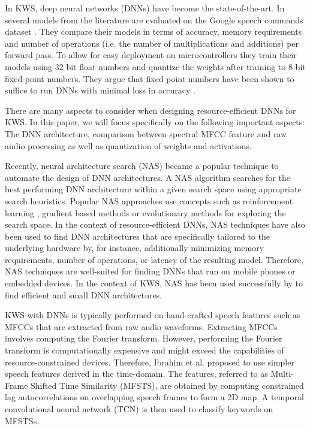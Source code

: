 \documentclass[a4paper]{article}
\begin{document}
In KWS, deep neural networks (DNNs) have become the state-of-the-art. In \cite{Zhang2017} several models from the literature \cite{Chen2014,Sainath2015,Arik2017,Sun2016} are evaluated on the Google speech commands dataset \cite{Warden2018}. They compare their models in terms of accuracy, memory requirements and number of operations (i.e. the number of multiplications and additions)  per forward pass. To allow for easy deployment on microcontrollers they train their models using 32 bit float numbers and quantize the weights after training to 8 bit fixed-point numbers. They argue that fixed point numbers have been shown to suffice to run DNNs with minimal loss in accuracy \cite{Suda2016,Qiu2016,Lai2017}.

There are many aspects to consider when designing resource-efficient DNNs for KWS. In this paper, we will focus specifically on the following important aspects: The DNN architecture, comparison between spectral MFCC feature and raw audio processing as well as quantization of weights and activations.

Recently, neural architecture search (NAS) became a popular technique to automate the design of DNN architectures. A NAS algorithm searches for the best performing DNN architecture within a given search space using appropriate search heuristics. Popular NAS approaches use concepts such as reinforcement learning \cite{Pham2018}, gradient based methods \cite{Liu2019} or evolutionary methods \cite{Liu2018} for exploring the search space. In the context of resource-efficient DNNs, NAS techniques have also been used to find DNN architectures that are specifically tailored to the underlying hardware \cite{Cai2019,Tan2019} by, for instance, additionally minimizing memory requirements, number of operations, or latency of the resulting model. Therefore, NAS techniques are well-suited for finding DNNs that run on mobile phones or embedded devices. In the context of KWS, NAS has been used successfully by \cite{Peter2020,Mo2020} to find efficient and small DNN architectures.

KWS with DNNs is typically performed on hand-crafted speech features such as MFCCs that are extracted from raw audio waveforms. Extracting MFCCs involves computing the Fourier transform. However, performing the Fourier transform is computationally expensive and might exceed the capabilities of resource-constrained devices. Therefore, Ibrahim et al. \cite{Ibrahim2019} proposed to use simpler speech features derived in the time-domain. The features, referred to as Multi-Frame Shifted Time Similarity (MFSTS), are obtained by computing constrained lag autocorrelations on overlapping speech frames to form a 2D map. A temporal convolutional neural network (TCN) \cite{Chiu2018} is then used to classify keywords on MFSTSs. 
\end{document}
